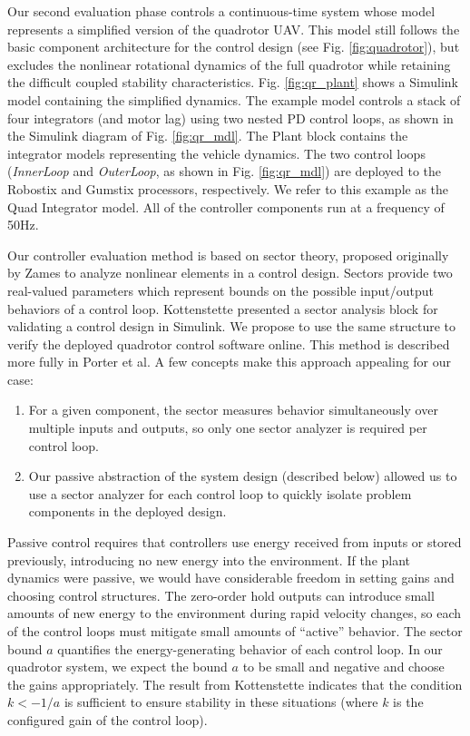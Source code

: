 Our second evaluation phase controls a continuous-time system whose model represents a simplified version of the quadrotor UAV.   This model still follows the  
basic component architecture for the control design (see Fig. \ref{fig:quadrotor}), but excludes the nonlinear rotational 
dynamics of the full quadrotor while retaining
the difficult coupled stability characteristics. Fig. \ref{fig:qr_plant} 
shows a Simulink model containing the simplified dynamics. The 
example model controls a stack of four integrators (and motor lag) 
using two nested PD control loops, as shown in the Simulink diagram of Fig. \ref{fig:qr_mdl}.  The Plant block contains the integrator models representing the vehicle dynamics. The two control loops (\emph{InnerLoop} and \emph{OuterLoop},
as shown in Fig. \ref{fig:qr_mdl}) are deployed to the Robostix and Gumstix
processors, respectively.  We refer to this example as the Quad Integrator model.  All of the controller components run at a frequency of 50Hz.  


Our controller evaluation method is based on sector theory, proposed originally by Zames\cite{control:sectors1} to analyze nonlinear elements in a control design.  Sectors provide two real-valued parameters which represent bounds on the possible input/output behaviors of a control loop.  Kottenstette presented a sector analysis block for validating a control design in Simulink\cite{quad:passcontrol}.  We propose to use the same structure to verify the deployed quadrotor control software online.  This method is described more fully in Porter et al\cite{pass:validation}.  A few concepts make this approach appealing for our case:

\begin{enumerate}
 \item For a given component, the sector measures behavior simultaneously over multiple inputs and outputs, so only one sector analyzer is required per control loop.
 \item Our passive abstraction of the system design (described below) allowed us to use a sector analyzer for each control loop to quickly isolate problem components in the deployed design.
\end{enumerate}

Passive control requires that controllers use energy received from inputs or stored previously, introducing no new energy into the environment\cite{pass:delasen}. If the plant dynamics were passive, we would have considerable freedom in setting gains and choosing control structures.  The zero-order hold outputs can introduce small amounts of new energy to the environment during rapid velocity changes, so each of the control loops must mitigate small amounts of ``active'' behavior.  The sector bound $a$ quantifies the energy-generating behavior of each control loop. In our quadrotor system, we expect the bound $a$ to be small and negative and choose the gains appropriately.  The result from Kottenstette indicates that the condition $k < -1/a$ is sufficient to ensure stability in these situations (where $k$ is the configured gain of the control loop)\cite{quad:passcontrol}.

